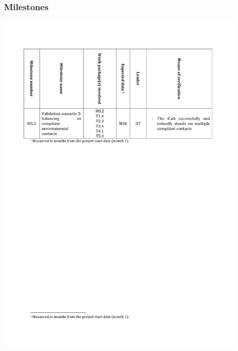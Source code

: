 \documentclass[12pt,a4paper,twoside]{article}
\begin{document}
\subsubsection{Milestones}
{\centering \includegraphics[width=0.9\textwidth]{./images/milestones.pdf}}

\clearpage




\end{document}
